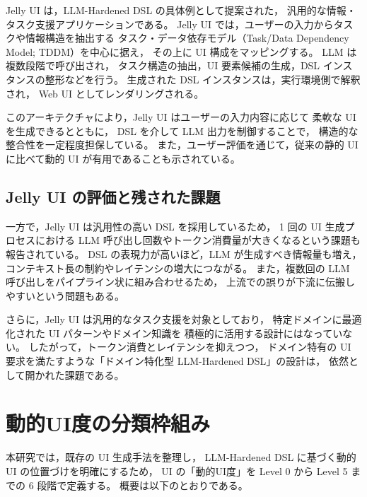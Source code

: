 \documentclass[senior,final,11pt,dvipdfmx]{iputit-thesis}
\begin{document}
Jelly UI は，LLM-Hardened DSL の具体例として提案された，
汎用的な情報・タスク支援アプリケーションである\cite{cao2025jelly}。
Jelly UI では，ユーザーの入力からタスクや情報構造を抽出する
タスク・データ依存モデル（Task/Data Dependency Model; TDDM）を中心に据え，
その上に UI 構成をマッピングする。
LLM は複数段階で呼び出され，
タスク構造の抽出，UI 要素候補の生成，DSL インスタンスの整形などを行う。
生成された DSL インスタンスは，実行環境側で解釈され，
Web UI としてレンダリングされる。

このアーキテクチャにより，Jelly UI はユーザーの入力内容に応じて
柔軟な UI を生成できるとともに，
DSL を介して LLM 出力を制御することで，
構造的な整合性を一定程度担保している。
また，ユーザー評価を通じて，従来の静的 UI に比べて動的 UI が有用であることも示されている。

\subsection{Jelly UI の評価と残された課題}

一方で，Jelly UI は汎用性の高い DSL を採用しているため，
1 回の UI 生成プロセスにおける LLM 呼び出し回数やトークン消費量が大きくなるという課題も報告されている。
DSL の表現力が高いほど，LLM が生成すべき情報量も増え，
コンテキスト長の制約やレイテンシの増大につながる\cite{du2025context}。
また，複数回の LLM 呼び出しをパイプライン状に組み合わせるため，
上流での誤りが下流に伝搬しやすいという問題もある。

さらに，Jelly UI は汎用的なタスク支援を対象としており，
特定ドメインに最適化された UI パターンやドメイン知識を
積極的に活用する設計にはなっていない。
したがって，トークン消費とレイテンシを抑えつつ，
ドメイン特有の UI 要求を満たすような「ドメイン特化型 LLM-Hardened DSL」の設計は，
依然として開かれた課題である。



\section{動的UI度の分類枠組み}

本研究では，既存の UI 生成手法を整理し，
LLM-Hardened DSL に基づく動的 UI の位置づけを明確にするため，
UI の「動的UI度」を Level 0 から Level 5 までの 6 段階で定義する。
概要は以下のとおりである。
\end{document}
